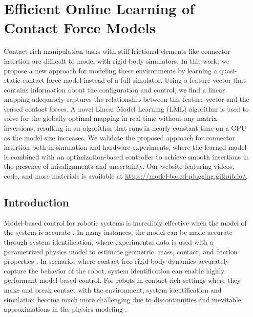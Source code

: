 \graphicspath{{plugging/}}


\chapter{Efficient Online Learning of Contact Force Models}
\label{sec:plugging}

Contact-rich manipulation tasks with stiff frictional elements like connector insertion are difficult to model with rigid-body simulators.  In this work, we propose a new approach for modeling these environments by learning a quasi-static contact force model instead of a full simulator. Using a feature vector that contains information about the configuration and control, we find a linear mapping adequately captures the relationship between this feature vector and the sensed contact forces.  A novel Linear Model Learning (LML) algorithm is used to solve for the globally optimal mapping in real time without any matrix inversions, resulting in an algorithm that runs in nearly constant time on a GPU as the model size increases. 
We validate the proposed approach for connector insertion both in simulation and hardware experiments, where the learned model is combined with an optimization-based controller to achieve smooth insertions in the presence of misalignments and uncertainty. Our website featuring videos, code, and more materials is available at \url{https://model-based-plugging.github.io/}.


%
\section{Introduction} \label{sec:plugging:intro}

Model-based control for robotic systems is incredibly effective when the model of the system is accurate \citep{tedrake2014}. In many instances, the model can be made accurate through system identification, where experimental data is used with a parametrized physics model to estimate geometric, mass, contact, and friction properties \citep{galrinho2016, hoburg2009}.  In scenarios where contact-free rigid-body dynamics accurately capture the behavior of the robot, system identification can enable highly performant model-based control. For robots in contact-rich settings where they make and break contact with the environment, system identification and simulation become much more challenging due to discontinuities and inevitable approximations in the physics modeling \citep{zhao2020}.

